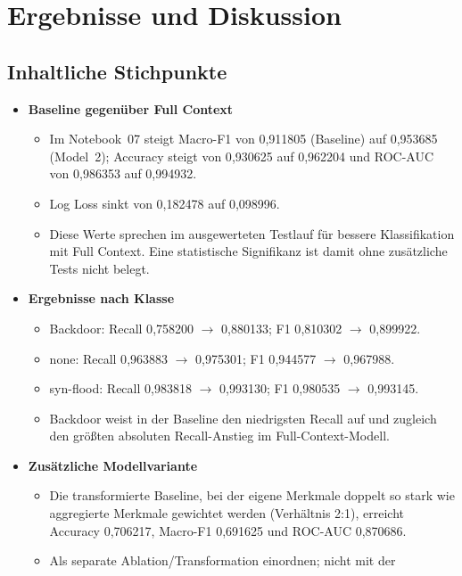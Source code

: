 \section{Ergebnisse und Diskussion}
\label{sec:results}

\subsection{Inhaltliche Stichpunkte}
\begin{itemize}
  \item \textbf{Baseline gegenüber Full Context}
  \begin{itemize}
    \item Im Notebook~07 steigt Macro-F1 von 0{,}911805 (Baseline) auf
          0{,}953685 (Model~2); Accuracy steigt von 0{,}930625 auf
          0{,}962204 und ROC-AUC von 0{,}986353 auf 0{,}994932.
    \item Log Loss sinkt von 0{,}182478 auf 0{,}098996.
    \item Diese Werte sprechen im ausgewerteten Testlauf für bessere
          Klassifikation mit Full Context. Eine statistische Signifikanz
          ist damit ohne zusätzliche Tests nicht belegt.
  \end{itemize}
  \item \textbf{Ergebnisse nach Klasse}
  \begin{itemize}
    \item Backdoor: Recall 0{,}758200 $\rightarrow$ 0{,}880133;
          F1 0{,}810302 $\rightarrow$ 0{,}899922.
    \item none: Recall 0{,}963883 $\rightarrow$ 0{,}975301;
          F1 0{,}944577 $\rightarrow$ 0{,}967988.
    \item syn-flood: Recall 0{,}983818 $\rightarrow$ 0{,}993130;
          F1 0{,}980535 $\rightarrow$ 0{,}993145.
    \item Backdoor weist in der Baseline den niedrigsten Recall auf und
          zugleich den größten absoluten Recall-Anstieg im Full-Context-Modell.
  \end{itemize}
  \item \textbf{Zusätzliche Modellvariante}
  \begin{itemize}
    \item Die transformierte Baseline, bei der eigene Merkmale doppelt so
          stark wie aggregierte Merkmale gewichtet werden (Verhältnis 2:1),
          erreicht Accuracy 0{,}706217,
          Macro-F1 0{,}691625 und ROC-AUC 0{,}870686.
    \item Als separate Ablation/Transformation einordnen; nicht mit der

\end{itemize}
\end{itemize}
